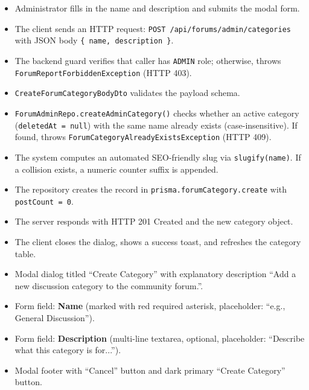 \begin{itemize}[leftmargin=1.6em,topsep=3pt,itemsep=2pt,parsep=0pt,label=$\bullet$]
    \item Administrator fills in the name and description and submits the modal form.
    \item The client sends an HTTP request: \texttt{POST /api/forums/admin/categories} with JSON body \texttt{\{ name, description \}}.
    \item The backend guard verifies that caller has \texttt{ADMIN} role; otherwise, throws \texttt{ForumReportForbiddenException} (HTTP 403).
    \item \texttt{CreateForumCategoryBodyDto} validates the payload schema.
    \item \texttt{ForumAdminRepo.createAdminCategory()} checks whether an active category (\texttt{deletedAt = null}) with the same name already exists (case-insensitive). If found, throws \texttt{ForumCategoryAlreadyExistsException} (HTTP 409).
    \item The system computes an automated SEO-friendly slug via \texttt{slugify(name)}. If a collision exists, a numeric counter suffix is appended.
    \item The repository creates the record in \texttt{prisma.forumCategory.create} with \texttt{postCount = 0}.
    \item The server responds with HTTP 201 Created and the new category object.
    \item The client closes the dialog, shows a success toast, and refreshes the category table.
\end{itemize}

\begin{itemize}[leftmargin=1.6em,topsep=3pt,itemsep=2pt,parsep=0pt,label=$\bullet$]
    \item Modal dialog titled ``Create Category'' with explanatory description ``Add a new discussion category to the community forum.''.
    \item Form field: \textbf{Name} (marked with red required asterisk, placeholder: ``e.g., General Discussion'').
    \item Form field: \textbf{Description} (multi-line textarea, optional, placeholder: ``Describe what this category is for...'').
    \item Modal footer with ``Cancel'' button and dark primary ``Create Category'' button.
\end{itemize}

